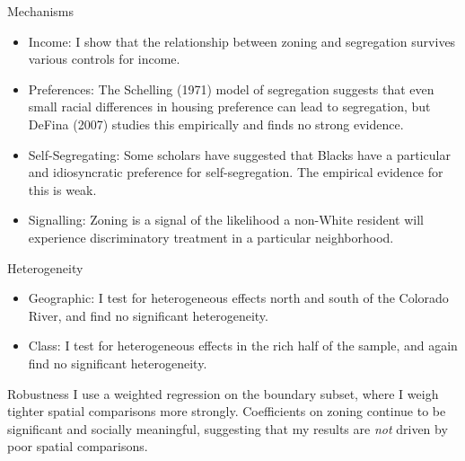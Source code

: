 \documentclass{beamer}
\begin{document}
\begin{frame}{Mechanisms}
    \begin{itemize}
        \item Income: I show that the relationship between zoning and segregation survives various controls for income.
        
        \item Preferences: The Schelling (1971) model of segregation suggests that even small racial differences in housing preference can lead to segregation, but DeFina (2007) studies this empirically and finds no strong evidence.
        
        \item Self-Segregating: Some scholars have suggested that Blacks have a particular and idiosyncratic preference for self-segregation. The empirical evidence for this is weak.

        \item Signalling: Zoning is a signal of the likelihood a non-White resident will experience discriminatory treatment in a particular neighborhood.       
    \end{itemize}
\end{frame}

\begin{frame}{Heterogeneity}
\begin{itemize}
    \item Geographic: I test for heterogeneous effects north and south of the Colorado River, and find no significant heterogeneity.

    \item Class: I test for heterogeneous effects in the rich half of the sample, and again find no significant heterogeneity.
\end{itemize}
\end{frame}

\begin{frame}{Robustness}
    I use a weighted regression on the boundary subset, where I weigh tighter spatial comparisons more strongly. Coefficients on zoning continue to be significant and socially meaningful, suggesting that my results are \textit{not} driven by poor spatial comparisons.
\end{frame}
\end{document}
